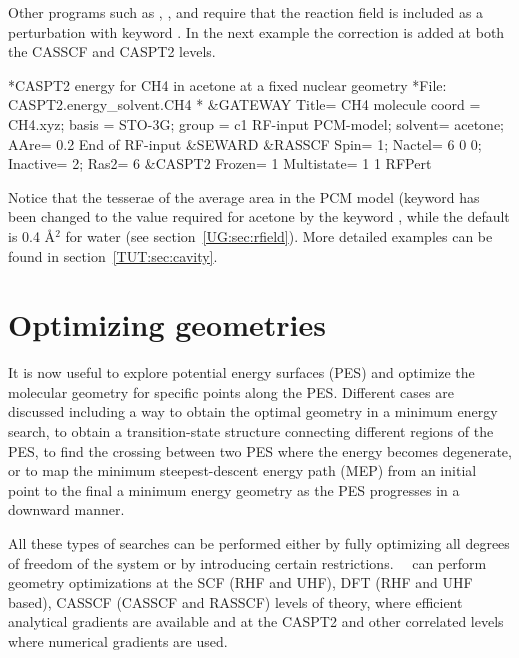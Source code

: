 Other programs such as , , and  require that
the reaction field is included as a perturbation with keyword .
In the next example the correction is added at both the CASSCF and CASPT2 levels.

\begin{inputlisting}
*CASPT2 energy for CH4 in acetone at a fixed nuclear geometry
*File: CASPT2.energy_solvent.CH4
*
&GATEWAY
 Title= CH4 molecule
 coord = CH4.xyz; basis = STO-3G; group = c1
  RF-input
   PCM-model; solvent= acetone; AAre= 0.2
  End of RF-input
&SEWARD
&RASSCF
  Spin= 1; Nactel= 6 0 0; Inactive= 2; Ras2= 6
&CASPT2
 Frozen= 1
 Multistate= 1 1
 RFPert
\end{inputlisting}

Notice that the tesserae of the average area in the PCM model (keyword
has been changed to the value required for acetone by the keyword ,
while the default is 0.4 \AA$^2$ for water 
\ifmanual
(see section~\ref{UG:sec:rfield}).
More detailed examples can be found in section~\ref{TUT:sec:cavity}. 
\fi

\section{Optimizing geometries}

It is now useful to explore potential energy surfaces (PES) and optimize the molecular geometry for
specific points along the PES. Different cases are discussed including a way to obtain the optimal geometry
in a minimum energy search, to obtain a transition-state structure connecting different regions of 
the PES, to find the crossing between two PES where the energy becomes degenerate, or to map
the minimum steepest-descent energy path (MEP) from an initial point to the final 
a minimum energy geometry as the PES progresses in a downward manner. 

All these types of searches can be performed either by fully optimizing all 
degrees of freedom of the system or by introducing certain restrictions. \molcas\ \molcasversion\ can perform
geometry optimizations at the SCF (RHF and UHF), DFT (RHF and UHF based), CASSCF (CASSCF and RASSCF) levels of theory, 
where efficient analytical gradients are available and at the CASPT2 and other correlated levels where numerical
gradients are used.

